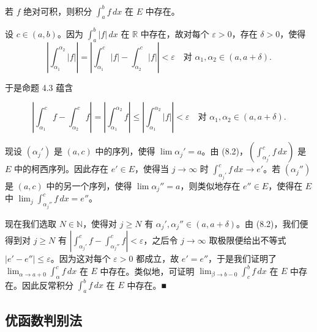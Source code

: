 \begin{proposition}

若 $ f $ 绝对可积，则积分 $ \int_{a}^{b} f\,dx $ 在 $ E $ 中存在。

\proofhead
设 $ c \in (a, b) $。因为 $ \int_{a}^{b} \left| f \right|\,dx $ 在 $ \mathbb{R} $ 中存在，故对每个 $ \varepsilon > 0 $，存在 $ \delta > 0 $，使得
\[
\left| \int_{\alpha_{1}}^{\alpha_{2}} \left| f \right| \right| = \left| \int_{\alpha_{1}}^{c} \left| f \right| - \int_{\alpha_{2}}^{c} \left| f \right| \right| < \varepsilon \quad \text{对 } \alpha_{1}, \alpha_{2} \in (a, a + \delta) .
\]

于是命题 4.3 蕴含

\begin{equation}
\left| \int_{\alpha_{1}}^{c} f - \int_{\alpha_{2}}^{c} f \right| = \left| \int_{\alpha_{1}}^{\alpha_{2}} f \right| \le \left| \int_{\alpha_{1}}^{\alpha_{2}} \left| f \right| \right| < \varepsilon \quad \text{对 } \alpha_{1}, \alpha_{2} \in (a, a + \delta) .\tag{8.2}
\end{equation}

现设 $ (\alpha_{j}') $ 是 $ (a, c) $ 中的序列，使得 $ \lim \alpha_{j}' = a $。由 (8.2)，$ (\int_{\alpha_{j}'}^{c} f\,dx) $ 是 $ E $ 中的柯西序列。因此存在 $ e' \in E $，使得当 $ j \to \infty $ 时 $ \int_{\alpha_{j}'}^{c} f\,dx \to e' $。若 $ (\alpha_{j}'') $ 是 $ (a, c) $ 中的另一个序列，使得 $ \lim \alpha_{j}'' = a $，则类似地存在 $ e'' \in E $，使得在 $ E $ 中 $ \lim_{j} \int_{\alpha_{j}''}^{c} f\,dx = e'' $。

现在我们选取 $ N \in \mathbb{N} $，使得对 $ j \ge N $ 有 $ \alpha_{j}', \alpha_{j}'' \in (a, a + \delta) $。由 (8.2)，我们便得到对 $ j \ge N $ 有 $ \left| \int_{\alpha_{j}'}^{c} f - \int_{\alpha_{j}''}^{c} f \right| < \varepsilon $，之后令 $ j \to \infty $ 取极限便给出不等式 $ \left| e' - e'' \right| \le \varepsilon $。因为这对每个 $ \varepsilon > 0 $ 都成立，故 $ e' = e'' $，于是我们证明了 $ \lim_{\alpha \to a+0} \int_{\alpha}^{c} f\,dx $ 在 $ E $ 中存在。类似地，可证明 $ \lim_{\beta \to b-0} \int_{c}^{b} f\,dx $ 在 $ E $ 中存在。因此反常积分 $ \int_{a}^{b} f\,dx $ 在 $ E $ 中存在。\nobreak\hspace{0.35em}■

\end{proposition}

\subsection*{优函数判别法}

